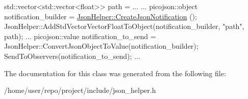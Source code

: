 \begin{DoxyCode}
std::vector<std::vector<float>> path = ...
...
picojson::object notification\_builder = \hyperlink{classcsci3081_1_1JsonHelper_a5a69da28dbe3017826d53bdc6d17652f}{JsonHelper::CreateJsonNotification}
      ();
JsonHelper::AddStdVectorVectorFloatToObject(notification\_builder, \textcolor{stringliteral}{"path"}, path);
...
picojson::value notification\_to\_send = JsonHelper::ConvertJsonObjectToValue(notification\_builder);
SendToObservers(notification\_to\_send);
...
\end{DoxyCode}
 

The documentation for this class was generated from the following file\+:\begin{DoxyCompactItemize}
\item 
/home/user/repo/project/include/json\+\_\+helper.\+h\end{DoxyCompactItemize}
